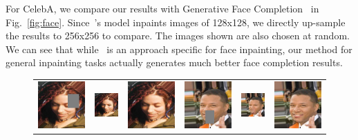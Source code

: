 For CelebA, we compare our results with Generative Face Completion~\cite{li2017generative} in Fig.~\ref{fig:face}. Since~\cite{li2017generative}'s model inpaints images of 128x128, we directly up-sample the results to 256x256 to compare. The images shown are also chosen at random. We can see that while~\cite{li2017generative} is an approach specific for face inpainting, our method for general inpainting tasks actually generates much better face completion results.

\begin{figure}[h!]
\centering
\small
\begin{tabular}{cccccc}
\includegraphics[width=.16\textwidth]{figures/face/000189_input_image.jpg}&
\includegraphics[width=.16\textwidth]{figures/face/res1/res.jpg}&
\includegraphics[width=.16\textwidth]{figures/face/000189_synthesized_image.jpg}&
\includegraphics[width=.16\textwidth]{figures/face/000194_input_image.jpg}&
\includegraphics[width=.16\textwidth]{figures/face/res2/res.jpg}&
\includegraphics[width=.16\textwidth]{figures/face/000194_synthesized_image.jpg}\\

\end{tabular}
\end{figure}
